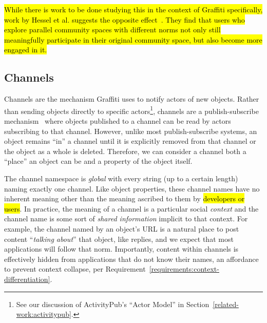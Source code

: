 \hl{%
While there is work to be done studying this in the context of Graffiti specifically,
work by Hessel et al.
suggests the opposite effect~{\cite{highlyrelatedcommunities}}.
They find that users who explore parallel community spaces
with different norms not only still meaningfully participate in their original community space,
but also become more engaged in it.
}%





\subsection{Channels}
\label{concepts:channels}

Channels are the mechanism Graffiti uses to notify
actors of new objects.
Rather than sending objects directly to specific actors\footnote{
    See our discussion of ActivityPub's ``Actor Model'' in Section~\ref{related-work:activitypub}.
},
channels are a publish-subscribe mechanism~\cite{pubsub}
where objects published to a channel
can be read by actors subscribing to that channel.
However, unlike most publish-subscribe systems,
an object remains ``in'' a channel until
it is explicitly removed from that channel
or the object as a whole is deleted.
Therefore, we can consider a channel both a ``place''
an object can be and a property of the object itself.

The channel namespace is \emph{global} with every string (up to a certain length)
naming exactly one channel.
Like object properties, these channel names have no inherent meaning
other than the meaning ascribed to them by \hl{developers or users}.
In practice, the meaning of a channel is a particular social \emph{context} and the channel
name is some sort of \emph{shared information} implicit to that context.
For example, the channel named by an object's URL is a natural place to post content ``\emph{talking about}'' that object, like replies, and we expect that most applications will follow that norm.
Importantly, content within channels is effectively hidden from applications
that do not know their names,
an affordance to prevent context collapse, per Requirement~\ref{requirements:context-differentiation}.

